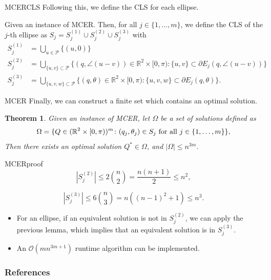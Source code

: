 \documentclass{beamer}
\newcommand{\R}{\mathbb{R}}
\newcommand{\Pp}{\mathscr{P}}
\newcommand{\bigO}{\mathscr{O}}
\newtheorem{thm}{Theorem}
\theoremstyle{definition}
\begin{document}
\begin{frame}{MCER}{CLS}
	Following this, we define the CLS for each ellipse.
	
	\begin{definition}\label{def:Sj}
		Given an instance of MCER. Then, for all $j\in\{1, \dots, m\}$, we define the CLS of the $j$-th ellipse as $S_j = S_j^{(1)} \cup S_j^{(2)} \cup S_j^{(3)}$ with
		\begin{align*}
		S_j^{(1)} &= \bigcup_{u \in \Pp} \{(u, 0)\}\\
		S_j^{(2)} &= \bigcup_{\{u, v\} \subset \Pp} \{(q, \angle(u-v))\in \R^2\times[0, \pi): \{u,v\} \subset \partial E_j(q, \angle(u-v))\}\\
		S_j^{(3)} &= \bigcup_{\{u, v, w\} \subset \Pp} \{(q, \theta)\in \R^2\times[0, \pi): \{u, v, w\} \subset \partial E_j(q, \theta)\}.
		\end{align*}
	\end{definition}
\end{frame}

\begin{frame}{MCER}
	Finally, we can construct a finite set which contains an optimal solution.
	
	\begin{thm}\label{th:mcer}
		Given an instance of MCER, let $\Omega$ be a set of solutions defined as 
		\begin{equation*}\label{eq:omega}
		\Omega = \{Q \in (\R^2\times[0, \pi))^m \colon (q_j, \theta_j) \in S_j \textnormal{ for all } j\in\{1, \dots, m\}\},
		\end{equation*}
		Then there exists an optimal solution $Q^* \in \Omega$, and $|\Omega|\le n^{3m}$.
	\end{thm}
\end{frame}

\begin{frame}{MCER}{proof}
$$|S_j^{(2)}| \le 2 \binom{n}{2} = \frac{n(n+1)}{2} \le n^2,$$

$$|S_j^{(3)}| \le 6 \binom{n}{3} = n((n-1)^2+1) \le n^3.$$

\begin{itemize}
	\item For an ellipse, if an equivalent solution is not in $S_j^{(2)}$, we can apply the previous lemma, which implies that an equivalent solution is in $S_j^{(3)}$.
	
	\item An $\bigO(mn^{3m+1})$ runtime algorithm can be implemented.
\end{itemize}
\end{frame}


\begin{frame}[allowframebreaks]
	\frametitle{References}
	
	
\end{frame}
	
\end{document}
